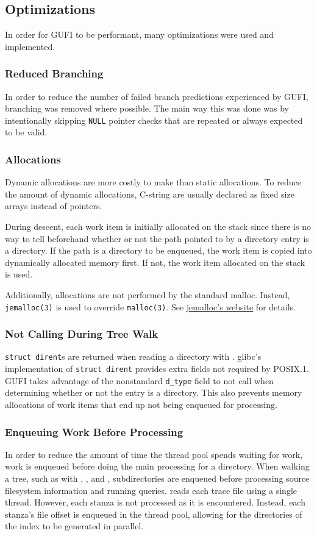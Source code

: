 \subsection{Optimizations}
In order for GUFI to be performant, many optimizations were used and
implemented.

\subsubsection{Reduced Branching}
In order to reduce the number of failed branch predictions experienced
by GUFI, branching was removed where possible. The main way this was
done was by intentionally skipping \texttt{NULL} pointer checks that
are repeated or always expected to be valid.

\subsubsection{Allocations}
Dynamic allocations are more costly to make than static
allocations. To reduce the amount of dynamic allocations, C-string are
usually declared as fixed size arrays instead of pointers.

During descent, each work item is initially allocated on the stack since
there is no way to tell beforehand whether or not the path pointed to
by a directory entry is a directory. If the path is a directory to be
enqueued, the work item is copied into dynamically allocated memory
first. If not, the work item allocated on the stack is used.

Additionally, allocations are not performed by the standard
malloc. Instead, \texttt{jemalloc(3)} is used to override
\texttt{malloc(3)}. See \href{https://jemalloc.net/}{jemalloc's
  website} for details.

\subsubsection{Not Calling \lstat During Tree Walk}
\texttt{struct~dirent}s are returned when reading a directory with
\readdir. glibc's implementation of \texttt{struct~dirent} provides
extra fields not required by POSIX.1. GUFI takes advantage of the
nonstandard \texttt{d\_type} field to not call \lstat when determining
whether or not the entry is a directory. This also prevents memory
allocations of work items that end up not being enqueued for
processing.

\subsubsection{Enqueuing Work Before Processing}
In order to reduce the amount of time the thread pool spends waiting
for work, work is enqueued before doing the main processing for a
directory. When walking a tree, such as with \gufidirindex,
\gufidirtrace, and \gufiquery, subdirectories are enqueued before
processing source filesystem information and running
queries. \gufitraceindex reads each trace file using a single
thread. However, each stanza is not processed as it is
encountered. Instead, each stanza's file offset is enqueued in the
thread pool, allowing for the directories of the index to be generated
in parallel.

